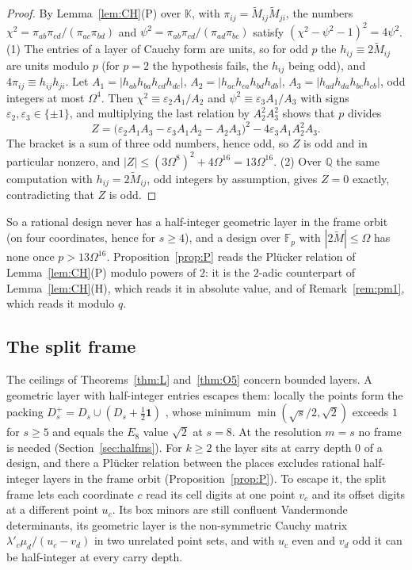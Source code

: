 \documentclass[11pt]{amsart}
\theoremstyle{definition}
\theoremstyle{plain}
\newcommand{\F}{\mathbb{F}}
\begin{document}
\begin{proof}
By Lemma~\ref{lem:CH}(P) over $\mathbb K$, with $\pi_{ij}=\tilde M_{ij}\tilde M_{ji}$, the numbers $\chi^2=\pi_{ab}\pi_{cd}/(\pi_{ac}\pi_{bd})$ and $\psi^2=\pi_{ab}\pi_{cd}/(\pi_{ad}\pi_{bc})$ satisfy $(\chi^2-\psi^2-1)^2=4\psi^2$.
(1) The entries of a layer of Cauchy form are units, so for odd $p$ the $h_{ij}\equiv2\tilde M_{ij}$ are units modulo $p$ (for $p=2$ the hypothesis fails, the $h_{ij}$ being odd), and $4\pi_{ij}\equiv h_{ij}h_{ji}$. Let $A_1=|h_{ab}h_{ba}h_{cd}h_{dc}|$, $A_2=|h_{ac}h_{ca}h_{bd}h_{db}|$, $A_3=|h_{ad}h_{da}h_{bc}h_{cb}|$, odd integers at most $\Omega^4$. Then $\chi^2\equiv\varepsilon_2A_1/A_2$ and $\psi^2\equiv\varepsilon_3A_1/A_3$ with signs $\varepsilon_2,\varepsilon_3\in\{\pm1\}$, and multiplying the last relation by $A_2^2A_3^2$ shows that $p$ divides
\[
Z=\bigl(\varepsilon_2A_1A_3-\varepsilon_3A_1A_2-A_2A_3\bigr)^2-4\varepsilon_3A_1A_2^2A_3 .
\]
The bracket is a sum of three odd numbers, hence odd, so $Z$ is odd and in particular nonzero, and $|Z|\le(3\Omega^8)^2+4\Omega^{16}=13\Omega^{16}$.
(2) Over $\mathbb{Q}$ the same computation with $h_{ij}=2\tilde M_{ij}$, odd integers by assumption, gives $Z=0$ exactly, contradicting that $Z$ is odd.
\end{proof}

So a rational design never has a half-integer geometric layer in the frame orbit (on four coordinates, hence for $s\ge4$), and a design over $\F_p$ with $|2\tilde M|\le\Omega$ has none once $p>13\Omega^{16}$. Proposition~\ref{prop:P} reads the Pl\"ucker relation of Lemma~\ref{lem:CH}(P) modulo powers of $2$: it is the $2$-adic counterpart of Lemma~\ref{lem:CH}(H), which reads it in absolute value, and of Remark~\ref{rem:pm1}, which reads it modulo $q$.

\subsection{The split frame}\label{sec:split}
The ceilings of Theorems~\ref{thm:L} and~\ref{thm:O5} concern bounded layers. A geometric layer with half-integer entries escapes them: locally the points form the packing $D_s^+=D_s\cup(D_s+\frac12\mathbf 1)$ \cite[Ch.~4]{CS99}, whose minimum $\min(\sqrt s/2,\sqrt2)$ exceeds $1$ for $s\ge5$ and equals the $E_8$ value $\sqrt2$ at $s=8$. At the resolution $m=s$ no frame is needed (Section~\ref{sec:halfms}). For $k\ge2$ the layer sits at carry depth $0$ of a design, and there a Pl\"ucker relation between the places excludes rational half-integer layers in the frame orbit (Proposition~\ref{prop:P}). To escape it, the split frame lets each coordinate $c$ read its cell digits at one point $v_c$ and its offset digits at a different point $u_c$. Its box minors are still confluent Vandermonde determinants, its geometric layer is the non-symmetric Cauchy matrix $\lambda'_c\mu_d/(u_c-v_d)$ in two unrelated point sets, and with $u_c$ even and $v_d$ odd it can be half-integer at every carry depth.
\end{document}

